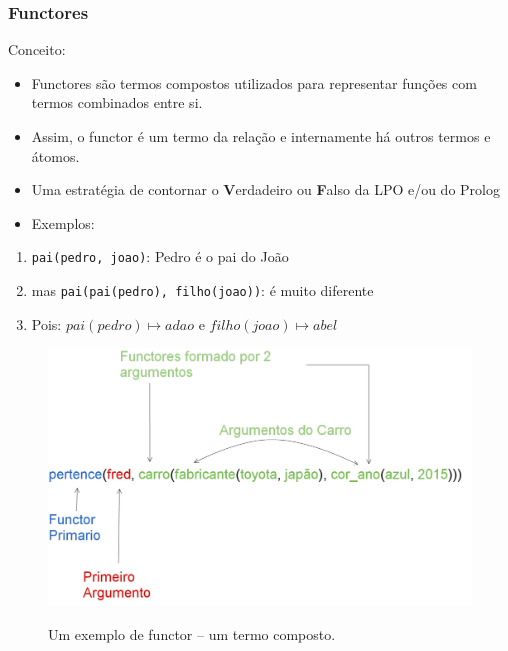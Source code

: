 \documentclass[sans]{beamer}
\begin{document}
\begin{frame}[fragile]   %
\frametitle{Functores}

\begin{block}{Conceito:}
\begin{itemize}
\itemsep 0.4cm

\item Functores são termos compostos  utilizados para representar funções 
com termos combinados entre si.

\item Assim, o functor é um termo da relação e internamente  há outros termos e átomos.  

\item Uma estratégia de contornar o \textbf{V}erdadeiro  ou \textbf{F}also da LPO e/ou do Prolog
\item Exemplos:
\end{itemize}

\begin{enumerate}

\item \texttt{pai(pedro, joao)}: Pedro é o pai do João
\item mas \texttt{pai(pai(pedro), filho(joao))}: é muito diferente
\item Pois: $pai(pedro) \mapsto adao$  e  $filho(joao) \mapsto abel$
\end{enumerate}

\end{block}   
\end{frame}

\begin{frame}
\begin{block}

\begin{figure}[!htb]
\centering
\includegraphics[scale = 0.22]{figuras/functorcomposto.pdf}
\label{fig_functor_termo}
\caption{Um exemplo de functor -- um termo composto.}
\end{figure}

\end{block}   
\end{frame}
\end{document}
